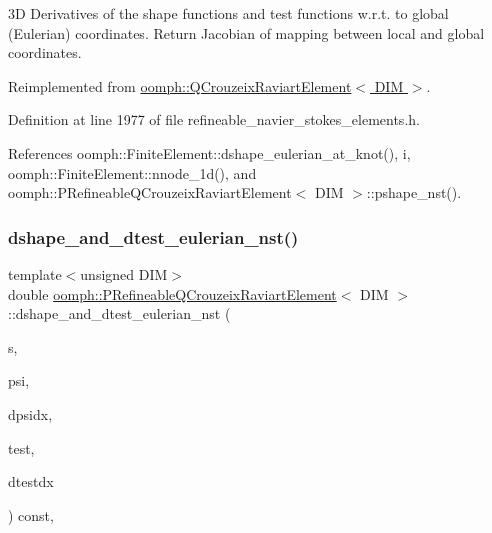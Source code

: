 3D Derivatives of the shape functions and test functions w.\+r.\+t. to global (Eulerian) coordinates. Return Jacobian of mapping between local and global coordinates. 

Reimplemented from \hyperlink{classoomph_1_1QCrouzeixRaviartElement_a3c4261300b81aae3ac358198b3e11906}{oomph\+::\+Q\+Crouzeix\+Raviart\+Element$<$ D\+I\+M $>$}.



Definition at line 1977 of file refineable\+\_\+navier\+\_\+stokes\+\_\+elements.\+h.



References oomph\+::\+Finite\+Element\+::dshape\+\_\+eulerian\+\_\+at\+\_\+knot(), i, oomph\+::\+Finite\+Element\+::nnode\+\_\+1d(), and oomph\+::\+P\+Refineable\+Q\+Crouzeix\+Raviart\+Element$<$ D\+I\+M $>$\+::pshape\+\_\+nst().

\mbox{\label{classoomph_1_1PRefineableQCrouzeixRaviartElement_a72a81749bb4c7f43462324935e1617a7}} 
\subsubsection{\texorpdfstring{dshape\+\_\+and\+\_\+dtest\+\_\+eulerian\+\_\+nst()}{dshape\_and\_dtest\_eulerian\_nst()}\hspace{0.1cm}{\footnotesize\ttfamily [1/3]}}
{\footnotesize\ttfamily template$<$unsigned D\+IM$>$ \\
double \hyperlink{classoomph_1_1PRefineableQCrouzeixRaviartElement}{oomph\+::\+P\+Refineable\+Q\+Crouzeix\+Raviart\+Element}$<$ D\+IM $>$\+::dshape\+\_\+and\+\_\+dtest\+\_\+eulerian\+\_\+nst (\begin{DoxyParamCaption}\item[{const \hyperlink{classoomph_1_1Vector}{Vector}$<$ double $>$ \&}]{s,  }\item[{\hyperlink{classoomph_1_1Shape}{Shape} \&}]{psi,  }\item[{\hyperlink{classoomph_1_1DShape}{D\+Shape} \&}]{dpsidx,  }\item[{\hyperlink{classoomph_1_1Shape}{Shape} \&}]{test,  }\item[{\hyperlink{classoomph_1_1DShape}{D\+Shape} \&}]{dtestdx }\end{DoxyParamCaption}) const\hspace{0.3cm}{\ttfamily [inline]}, {\ttfamily [virtual]}}



